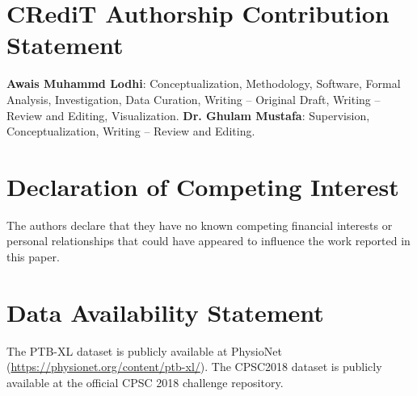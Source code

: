 \documentclass[5p,twocolumn,10pt]{elsarticle}
\begin{document}
\section*{CRediT Authorship Contribution Statement}
\textbf{Awais Muhammd Lodhi}: Conceptualization, Methodology, Software, Formal Analysis, Investigation, Data Curation, Writing -- Original Draft, Writing -- Review and Editing, Visualization.
\textbf{Dr. Ghulam Mustafa}: Supervision, Conceptualization, Writing -- Review and Editing.

\section*{Declaration of Competing Interest}
The authors declare that they have no known competing financial interests or personal relationships that could have appeared to influence the work reported in this paper.

\section*{Data Availability Statement}
The PTB-XL dataset is publicly available at PhysioNet (\url{https://physionet.org/content/ptb-xl/}). The CPSC2018 dataset is publicly available at the official CPSC 2018 challenge repository.



\end{document}

